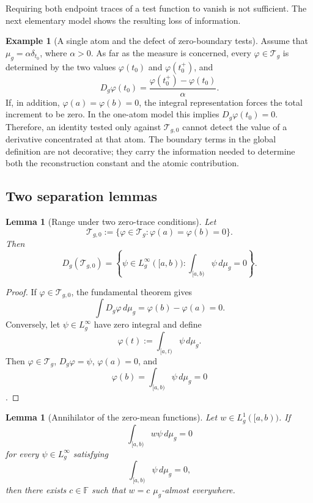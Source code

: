 \documentclass[preprint,12pt]{elsarticle}
\newtheorem{lemma}[theorem]{Lemma}
\theoremstyle{definition}
\newtheorem{example}[theorem]{Example}
\theoremstyle{remark}
\newcommand{\F}{\mathbb F}
\newcommand{\mug}{\mu_g}
\begin{document}
Requiring both endpoint traces of a test function to vanish is not sufficient. The next elementary model shows the resulting loss of information.

\begin{example}[A single atom and the defect of zero-boundary tests]\label{ex:one-atom-tests}
Assume that $\mu_g=\alpha\delta_{t_0}$, where $\alpha>0$. As far as the measure is concerned, every $\varphi\in\mathcal T_g$ is determined by the two values $\varphi(t_0)$ and $\varphi(t_0^+)$, and
\[
 D_g\varphi(t_0)=\frac{\varphi(t_0^+)-\varphi(t_0)}{\alpha}.
\]
If, in addition, $\varphi(a)=\varphi(b)=0$, the integral representation forces the total increment to be zero. In the one-atom model this implies $D_g\varphi(t_0)=0$. Therefore, an identity tested only against $\mathcal T_{g,0}$ cannot detect the value of a derivative concentrated at that atom. The boundary terms in the global definition are not decorative; they carry the information needed to determine both the reconstruction constant and the atomic contribution.
\end{example}

\subsection{Two separation lemmas}

\begin{lemma}[Range under two zero-trace conditions]\label{lem:range-zero}
Let
\[
 \mathcal T_{g,0}:=\{\varphi\in\mathcal T_g:\varphi(a)=\varphi(b)=0\}.
\]
Then
\begin{equation}\label{eq:range-zero}
 D_g(\mathcal T_{g,0})
 =\left\{\psi\in L_g^\infty([a,b)):\int_{[a,b)}\psi\,d\mug=0\right\}.
\end{equation}
\end{lemma}

\begin{proof}
If $\varphi\in\mathcal T_{g,0}$, the fundamental theorem gives
\[
 \int D_g\varphi\,d\mug=\varphi(b)-\varphi(a)=0.
\]
Conversely, let $\psi\in L_g^\infty$ have zero integral and define
\[
 \varphi(t):=\int_{[a,t)}\psi\,d\mug.
\]
Then $\varphi\in\mathcal T_g$, $D_g\varphi=\psi$, $\varphi(a)=0$, and \[\varphi(b)=\int_{[a,b)}\psi\,d\mug=0\].
\end{proof}

\begin{lemma}[Annihilator of the zero-mean functions]\label{lem:dubois}
Let $w\in L_g^1([a,b))$. If
\[
 \int_{[a,b)} w\psi\,d\mug=0
\]
for every $\psi\in L_g^\infty$ satisfying \[\int_{[a,b)}\psi\,d\mug=0,\] then there exists $c\in\F$ such that $w=c$ $\mug$-almost everywhere.
\end{lemma}
\end{document}
